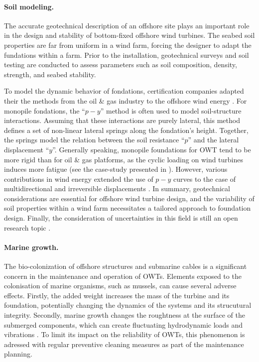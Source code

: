 \paragraph{Soil modeling.}
The accurate geotechnical description of an offshore site plays an important role in the design and stability of bottom-fixed offshore wind turbines. 
The seabed soil properties are far from uniform in a wind farm, forcing the designer to adapt the fundations within a farm. 
Prior to the installation, geotechnical surveys and soil testing are conducted to assess parameters such as soil composition, density, strength, and seabed stability. 

To model the dynamic behavior of fondations, certification companies adapted their the methods from the oil \& gas industry to the offshore wind energy \citep{dnv_2018_soil}. 
For monopile fondations, the ``$p-y$'' method is often used to model soil-structure interactions. 
Assuming that these interactions are purely lateral, this method defines a set of non-linear lateral springs along the fondation's height.  
Together, the springs model the relation between the soil resistance ``$p$'' and the lateral displacement ``$y$''. 
Generally speaking, monopile foundations for OWT tend to be more rigid than for oil \& gas platforms, as the cyclic loading on wind turbines induces more fatigue (see the case-study presented in \citet{le_2014_geotech_casestudy}).  
However, various contributions in wind energy extended the use of $p-y$ curves to the case of multidirectional and irreversible displacements \citep{lovera_2019_thesis}. 
In summary, geotechnical considerations are essential for offshore wind turbine design, and the variability of soil properties within a wind farm necessitates a tailored approach to foundation design. 
Finally, the consideration of uncertainties in this field is still an open research topic \citep{reale_2021_OWT_soil_uncertainties}.



\paragraph{Marine growth.}
The bio-colonization of offshore structures and submarine cables is a significant concern in the maintenance and operation of OWTs. 
Elements exposed to the colonisation of marine organisms, such as mussels, can cause several adverse effects. 
Firstly, the added weight increases the mass of the turbine and its foundation, potentially changing the dynamics of the systems and its strucutural integrity. \citep{ameryoun_2019_marine_growth,schoefs_2022_reliability_marine_growth}
Secondly, marine growth changes the roughtness at the surface of the submerged components, which can create fluctuating hydrodynamic loads and vibrations \citep{marty_2021_cable_marine_growth}. 
To limit its impact on the reliability of OWTs, this phenomenon is adressed with regular preventive cleaning measures as part of the maintenance planning. 


